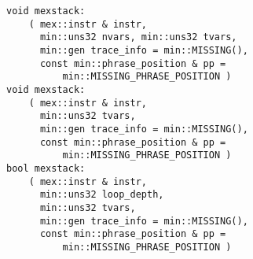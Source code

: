 \documentclass[12pt]{article}
\begin{document}
\verb|void mexstack:|  \label{BEGX} \\
\verb|    ( mex::instr & instr,| \\
\verb|      min::uns32 nvars, min::uns32 tvars,| \\
\verb|      min::gen trace_info = min::MISSING(),| \\
\verb|      const min::phrase_position & pp =| \\
\verb|          min::MISSING_PHRASE_POSITION )|
\\[0.5ex]
\verb|void mexstack:|  \label{ENDX} \\
\verb|    ( mex::instr & instr,| \\
\verb|      min::uns32 tvars,| \\
\verb|      min::gen trace_info = min::MISSING(),| \\
\verb|      const min::phrase_position & pp =| \\
\verb|          min::MISSING_PHRASE_POSITION )|
\\[0.5ex]
\verb|bool mexstack:|  \label{CONT} \\
\verb|    ( mex::instr & instr,| \\
\verb|      min::uns32 loop_depth,| \\
\verb|      min::uns32 tvars,| \\
\verb|      min::gen trace_info = min::MISSING(),| \\
\verb|      const min::phrase_position & pp =| \\
\verb|          min::MISSING_PHRASE_POSITION )|
\end{document}

